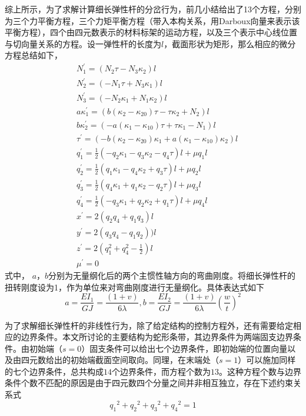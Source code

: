 综上所示，为了求解计算细长弹性杆的分岔行为，前几小结给出了13个方程，分别为三个力平衡方程，三个力矩平衡方程（带入本构关系，用Darboux向量来表示该平衡方程），四个由四元数表示的材料标架的运动方程，以及三个表示中心线位置与切向量关系的方程。设一弹性杆的长度为$l$，截面形状为矩形，那么相应的微分方程总结如下，
\begin{equation}
	\begin{split}
	&N_{1}^{\prime}=(N_{2} \tau-N_{3} \kappa_{2})l\\
	&N_{2}^{\prime}=(-N_{1} \tau+N_{3} \kappa_{1})l \\
	&N_{3}^{\prime}=(-N_{2} \kappa_{1}+N_{1} \kappa_{2})l \\
	&a \kappa_{1}^{\prime}=(b\left(\kappa_{2}-\kappa_{20}\right) \tau-\tau \kappa_{2}+N_{2})l \\
	&b \kappa_{2}^{\prime}=(-a (\kappa_{1}-\kappa_{10}) \tau+\tau \kappa_{1}-N_{1})l \\\
	&\tau^{\prime}=(-b\left(\kappa_{2}-\kappa_{20}\right) \kappa_{1}+a (\kappa_{1}-\kappa_{10}) \kappa_{2})l \\ 
	&q_{1}^{\prime}=\frac{1}{2}\left(-q_{2} \kappa_{1}-q_{3} \kappa_{2}-q_{4} \tau\right)l+\mu q_{1}l\\
	&q_{2}^{\prime}=\frac{1}{2}\left(q_{1} \kappa_{1}-q_{4} \kappa_{2}+q_{3} \tau\right)l+\mu q_{2}l\\ 
	&q_{3}^{\prime}=\frac{1}{2}\left(q_{4} \kappa_{1}+q_{1} \kappa_{2}-q_{2} \tau\right)l+\mu q_{3}l\\ 
	&q_{4}^{\prime}=\frac{1}{2}\left(-q_{3} \kappa_{1}+q_{2} \kappa_{2}+q_{1} \tau\right)l+\mu q_{4}l \\
	&x^{\prime}=2\left(q_{2} q_{4}+q_{1} q_{3}\right)l\\
	&y^{\prime}=2\left(q_{3} q_{4}-q_{1} q_{2}\right))l\\
	&z^{\prime}=2\left(q_{1}^{2}+q_{4}^{2}-\frac{1}{2}\right)l\\
    &\mu^{\prime}=0
	\end{split}
	\label{eq:ToTle Equation}
\end{equation}
式中， $a$，$b$分别为无量纲化后的两个主惯性轴方向的弯曲刚度。将细长弹性杆的扭转刚度设为1，作为单位来对弯曲刚度进行无量纲化。具体表达式如下
\begin{equation}
	a=\frac{E I_{1}}{G J}=\frac{(1+v)}{6 \lambda}, b=\frac{E I_{2}}{G J}=\frac{(1+v)}{6 \lambda}\left(\frac{w}{t}\right)^{2}
\end{equation}

为了求解细长弹性杆的非线性行为，除了给定结构的控制方程外，还有需要给定相应的边界条件。本文所讨论的主要结构为蛇形条带，其边界条件为两端固支边界条件。由初始端（$s=0$）固支条件可以给出七个边界条件，即初始端的位置向量以及由四元数给出的初始端截面空间取向。同理，在末端处（$s=1$）可以施加同样的七个边界条件，总共构成$14$个边界条件，而方程个数为$13$。这种方程个数与边界条件个数不匹配的原因是由于四元数四个分量之间并非相互独立，存在下述约束关系式
\begin{equation}
	{q_1}^2+{q_2}^2+{q_3}^2+{q_4}^2=1
	\label{eq:constraint term}
\end{equation}

